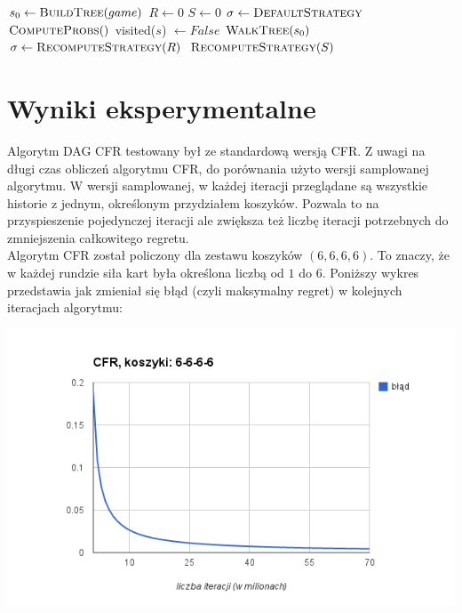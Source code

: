\documentclass[licencjacka]{pracamgr}
\begin{document}
\begin{algorithmic}
        \State $s_0\gets \Call{BuildTree}{game}$
        \State $R \gets 0$
        \State $S \gets 0$
        \State $\sigma \gets \Call{DefaultStrategy}{}$ 
            \State $\Call{ComputeProbs}{}()$
                \State visited($s$) $\gets False$
            \EndFor
            \State $\Call{WalkTree}{s_0}$
            \State $\sigma \gets \Call{RecomputeStrategy}{R}$
        \EndFor
        \State \Return $\Call{RecomputeStrategy}{S}$
    \EndFunction
\end{algorithmic}


\chapter{Wyniki eksperymentalne}

\noindent
Algorytm DAG CFR testowany był ze standardową wersją CFR. Z uwagi na długi czas obliczeń
algorytmu CFR, do porównania użyto wersji samplowanej algorytmu. W wersji samplowanej,
w każdej iteracji przeglądane są wszystkie historie z jednym, określonym przydziałem koszyków.
Pozwala to na przyspieszenie pojedynczej iteracji ale zwiększa też liczbę iteracji potrzebnych do
zmniejszenia całkowitego regretu. \\

\noindent
Algorytm CFR został policzony dla zestawu koszyków $(6,6,6,6)$. To znaczy, że w każdej rundzie
siła kart była określona liczbą od $1$ do $6$. Poniższy wykres przedstawia jak zmieniał się
błąd (czyli maksymalny regret) w kolejnych iteracjach algorytmu:

\includegraphics[scale=0.7]{wykres-cfr-6.png}
\end{document}
